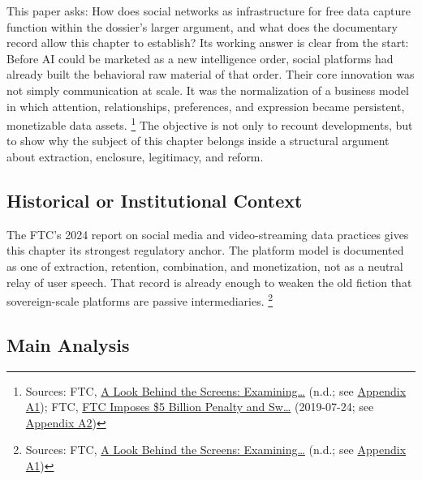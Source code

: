 \documentclass[
  american,
  11pt,
  letterpaper,
]{article}
\begin{document}
This paper asks: How does social networks as infrastructure for free
data capture function within the dossier's larger argument, and what
does the documentary record allow this chapter to establish? Its working
answer is clear from the start: Before AI could be marketed as a new
intelligence order, social platforms had already built the behavioral
raw material of that order. Their core innovation was not simply
communication at scale. It was the normalization of a business model in
which attention, relationships, preferences, and expression became
persistent, monetizable data assets. \footnote{Sources: FTC,
  \href{https://www.ftc.gov/reports/look-behind-screens-examining-data-practices-social-media-video-streaming-services}{A
  Look Behind the Screens: Examining\ldots{}} (n.d.; see
  \hyperref[ch-01-appendix-a1-a-look-behind-the-screens-examining-the-data-practices-of-social-media-and-video-streaming-services]{Appendix
  A1}); FTC,
  \href{https://www.ftc.gov/news-events/news/press-releases/2019/07/ftc-imposes-5-billion-penalty-sweeping-new-privacy-restrictions-facebook}{FTC
  Imposes \$5 Billion Penalty and Sw\ldots{}} (2019-07-24; see
  \hyperref[ch-01-appendix-a2-ftc-imposes-5-billion-penalty-and-sweeping-new-privacy-restrictions-on-facebook]{Appendix
  A2})} The objective is not only to recount developments, but to show
why the subject of this chapter belongs inside a structural argument
about extraction, enclosure, legitimacy, and reform.

\subsection{Historical or Institutional
Context}\label{historical-or-institutional-context-1}

The FTC's 2024 report on social media and video-streaming data practices
gives this chapter its strongest regulatory anchor. The platform model
is documented as one of extraction, retention, combination, and
monetization, not as a neutral relay of user speech. That record is
already enough to weaken the old fiction that sovereign-scale platforms
are passive intermediaries. \footnote{Sources: FTC,
  \href{https://www.ftc.gov/reports/look-behind-screens-examining-data-practices-social-media-video-streaming-services}{A
  Look Behind the Screens: Examining\ldots{}} (n.d.; see
  \hyperref[ch-01-appendix-a1-a-look-behind-the-screens-examining-the-data-practices-of-social-media-and-video-streaming-services]{Appendix
  A1})}

\subsection{Main Analysis}\label{main-analysis-1}
\end{document}
